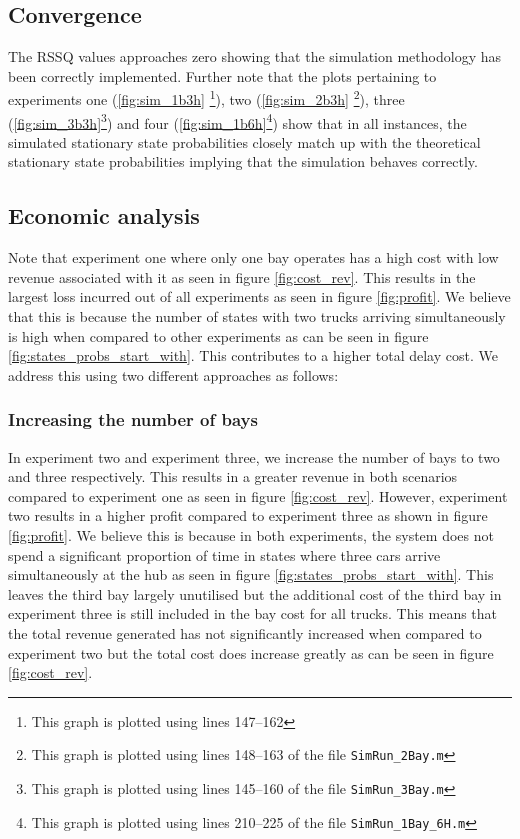 \documentclass{article}
\theoremstyle{definition}
\theoremstyle{remark}
\numberwithin{equation}{section}
\begin{document}
\subsection{Convergence} \label{sec:conv_disc}
The RSSQ values approaches zero showing that the simulation methodology has been correctly implemented. Further note that the plots pertaining to experiments one (\ref{fig:sim_1b3h} \footnote{This graph is plotted using lines 147--162}), two (\ref{fig:sim_2b3h} \footnote{This graph is plotted using lines 148--163 of the file \lstinline|SimRun_2Bay.m|}), three (\ref{fig:sim_3b3h}\footnote{This graph is plotted using lines 145--160 of the file \lstinline|SimRun_3Bay.m|})  and four (\ref{fig:sim_1b6h}\footnote{This graph is plotted using lines 210--225 of the file \lstinline|SimRun_1Bay_6H.m|}) show that in all instances, the simulated stationary state probabilities closely match up with the theoretical stationary state probabilities implying that the simulation behaves correctly.

\subsection{Economic analysis}

Note that experiment one where only one bay operates has a high cost with low revenue associated with it as seen in figure \ref{fig:cost_rev}. This results in the largest loss incurred out of all experiments as seen in figure \ref{fig:profit}. We believe that this is because the number of states with two trucks arriving simultaneously is high when compared to other experiments as can be seen in figure \ref{fig:states_probs_start_with}. This contributes to a higher total delay cost. We address this using two different approaches as follows:

\subsubsection{Increasing the number of bays}
In experiment two and experiment three, we increase the number of bays to two and three respectively. This results in a greater revenue in both scenarios compared to experiment one as seen in figure \ref{fig:cost_rev}. However, experiment two results in a higher profit compared to experiment three as shown in figure \ref{fig:profit}. We believe this is because in both experiments, the system does not spend a significant proportion of time in states where three cars arrive simultaneously at the hub as seen in figure \ref{fig:states_probs_start_with}. This leaves the third bay largely unutilised but the additional cost of the third bay in experiment three is still included in the bay cost for all trucks. This means that the total revenue generated has not significantly increased when compared to experiment two but the total cost does increase greatly as can be seen in figure \ref{fig:cost_rev}.
\end{document}
